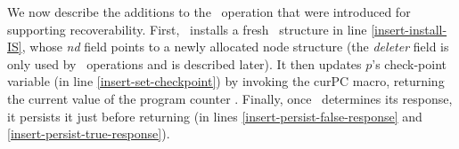 We now describe the additions to the \insertlst\ operation that were introduced 
for supporting recoverability. First, \insertlst\ installs a fresh \Info\ structure 
in line \ref{insert-install-IS}, whose \emph{nd} field points 
to a newly allocated node structure (the \emph{deleter} field is only 
used by \delete\ operations and is described later). 
It then updates $p$'s check-point variable (in line \ref{insert-set-checkpoint}) 
by invoking the curPC macro, returning the current value of the program counter 
. 
Finally, once \insertlst\ determines its response, 
it persists it just before returning (in lines \ref{insert-persist-false-response} 
and \ref{insert-persist-true-response}).

